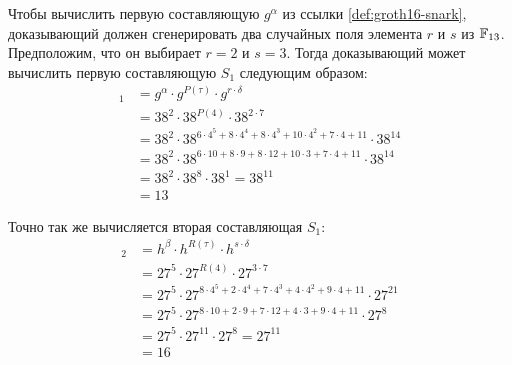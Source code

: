 Чтобы вычислить первую составляющую $g^\alpha$ из ссылки \ref{def:groth16-snark}, доказывающий должен сгенерировать два случайных поля элемента $r$ и $s$ из $\mathbb{F}_{13}$. Предположим, что он выбирает $r=2$ и $s=3$. Тогда доказывающий может вычислить первую составляющую $S_1$ следующим образом:
\begin{align*}
[\mathbb{A}]_1 & = g^\alpha\cdot g^{P(\tau)} \cdot g^{r\cdot \delta}\\
               & = 38^{2}\cdot 38^{P(4)}\cdot 38^{2\cdot 7}\\
               & = 38^{2}\cdot 38^{6\cdot 4^5 + 8\cdot 4^4 + 8\cdot 4^3 + 10\cdot 4^2 + 7\cdot 4 + 11}\cdot 38^{14}\\
               & = 38^{2}\cdot 38^{6\cdot 10 + 8\cdot 9 + 8\cdot 12 + 10\cdot 3 + 7\cdot 4 + 11}\cdot 38^{14}\\
               & = 38^{2}\cdot 38^{8}\cdot 38^{1} = 38^{11}\\
               & = 13
\end{align*}

Точно так же вычисляется вторая составляющая $S_1$:
\begin{align*}
[\mathbb{B}]_2 & = h^\beta \cdot h^{R(\tau)} \cdot h^{s\cdot \delta}\\
               & = 27^{5}\cdot 27^{R(4)}\cdot 27^{3\cdot 7}\\
               & = 27^{5}\cdot 27^{8\cdot 4^5 + 2\cdot 4^4 + 7\cdot 4^3 + 4\cdot 4^2 + 9\cdot 4 + 11}\cdot 27^{21}\\
               & = 27^{5}\cdot 27^{8\cdot 10 + 2\cdot 9 + 7\cdot 12 + 4\cdot 3 + 9\cdot 4 + 11}\cdot 27^{8}\\
               & = 27^{5}\cdot 27^{11}\cdot 27^{8} = 27^{11}\\
               & = 16
\end{align*}

